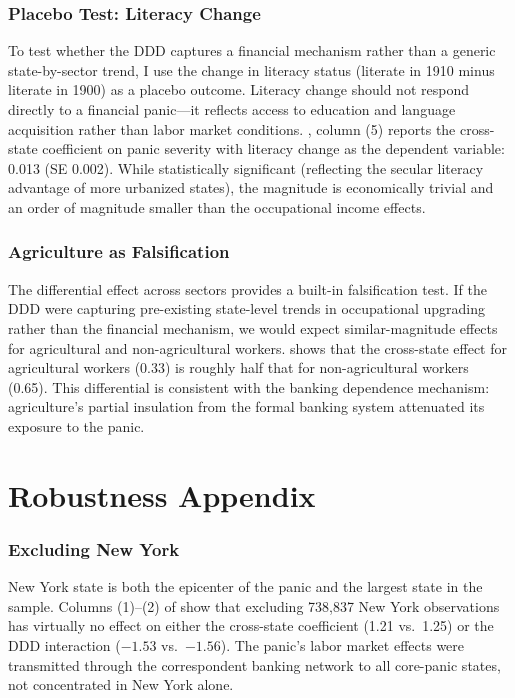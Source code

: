 \documentclass[12pt]{article}
\begin{document}
\subsubsection*{Placebo Test: Literacy Change} To test whether the DDD captures a financial mechanism rather than a generic state-by-sector trend, I use the change in literacy status (literate in 1910 minus literate in 1900) as a placebo outcome. Literacy change should not respond directly to a financial panic---it reflects access to education and language acquisition rather than labor market conditions. , column (5) reports the cross-state coefficient on panic severity with literacy change as the dependent variable: 0.013 (SE 0.002). While statistically significant (reflecting the secular literacy advantage of more urbanized states), the magnitude is economically trivial and an order of magnitude smaller than the occupational income effects.

\subsubsection*{Agriculture as Falsification} The differential effect across sectors provides a built-in falsification test. If the DDD were capturing pre-existing state-level trends in occupational upgrading rather than the financial mechanism, we would expect similar-magnitude effects for agricultural and non-agricultural workers.  shows that the cross-state effect for agricultural workers (0.33) is roughly half that for non-agricultural workers (0.65). This differential is consistent with the banking dependence mechanism: agriculture's partial insulation from the formal banking system attenuated its exposure to the panic.

\section{Robustness Appendix}

\subsubsection*{Excluding New York} New York state is both the epicenter of the panic and the largest state in the sample. Columns (1)--(2) of  show that excluding 738,837 New York observations has virtually no effect on either the cross-state coefficient (1.21 vs.\ 1.25) or the DDD interaction ($-1.53$ vs.\ $-1.56$). The panic's labor market effects were transmitted through the correspondent banking network to all core-panic states, not concentrated in New York alone.
\end{document}
